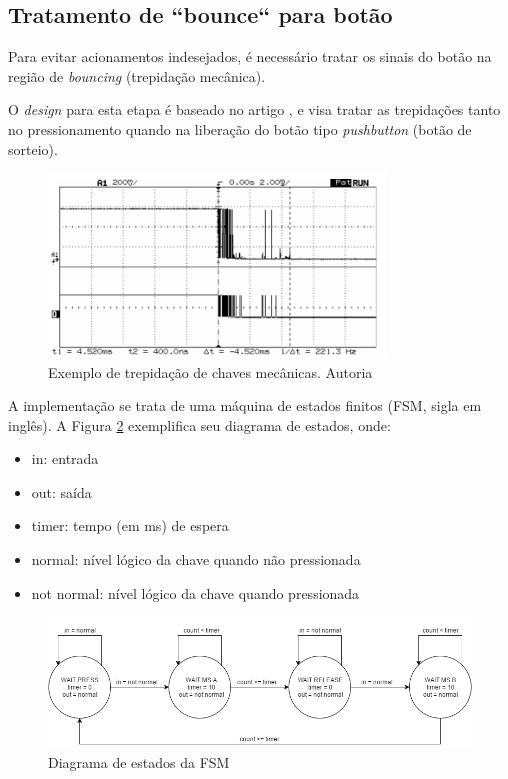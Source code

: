 \documentclass[12pt]{article}
\begin{document}

\subsection{Tratamento de ``bounce`` para botão}
Para evitar acionamentos indesejados, é necessário tratar os sinais do botão na região de \emph{bouncing} (trepidação mecânica).

O \emph{design} para esta etapa é baseado no artigo \cite{debouncing-guide}, e visa tratar as trepidações tanto no pressionamento quando na liberação do botão tipo \emph{pushbutton} (botão de sorteio).

\begin{figure}[!h]
    \centering
    \includegraphics[width=0.8\textwidth]{img/debouncing_exemplo.jpg}
    \caption{Exemplo de trepidação de chaves mecânicas. Autoria \cite{debouncing-guide}}
    \label{fig:debouncing-ex}
\end{figure}

A implementação se trata de uma máquina de estados finitos (FSM, sigla em inglês). A Figura \ref{fig:debouncing-fsm} exemplifica seu diagrama de estados, onde:

\begin{itemize}
    \item in: entrada
    \item out: saída
    \item timer: tempo (em ms) de espera
    \item normal: nível lógico da chave quando não pressionada
    \item not normal: nível lógico da chave quando pressionada
\end{itemize}

\begin{figure}[!h]
    \centering
    \includegraphics[width=1.0\textwidth]{img/fsm_debounce_sw.png}
    \caption{Diagrama de estados da FSM}
    \label{fig:debouncing-fsm}
\end{figure}
\end{document}

